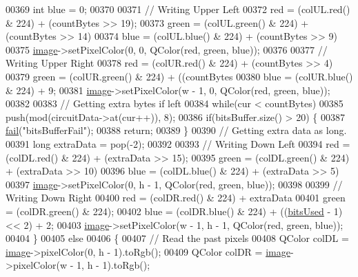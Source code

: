 \begin{DoxyCode}
00369         \textcolor{keywordtype}{int} blue = 0;
00370 
00371         \textcolor{comment}{// Writing Upper Left}
00372         red = (colUL.red() & 224) + (countBytes >> 19);
00373         green = (colUL.green() & 224) + (countBytes >> 14) %
00374         blue = (colUL.blue() & 224) + (countBytes >> 9) %
00375         \mbox{\hyperlink{namespacetests-setup_ad55b685280f549e15688a94cbb89f512}{image}}->setPixelColor(0, 0, QColor(red, green, blue));
00376 
00377         \textcolor{comment}{// Writing Upper Right}
00378         red = (colUR.red() & 224) + (countBytes >> 4) %
00379         green = (colUR.green() & 224) + ((countBytes %
00380         blue = (colUR.blue() & 224) + 9;
00381         \mbox{\hyperlink{namespacetests-setup_ad55b685280f549e15688a94cbb89f512}{image}}->setPixelColor(w - 1, 0, QColor(red, green, blue));
00382 
00383         \textcolor{comment}{// Getting extra bytes if left}
00384         \textcolor{keywordflow}{while}(cur < countBytes)
00385             push(mod(circuitData->at(cur++)), 8);
00386         \textcolor{keywordflow}{if}(bitsBuffer.size() > 20) \{
00387             \mbox{\hyperlink{class_model_p_c_a47464b59b7e37fcee25e55475708aabd}{fail}}(\textcolor{stringliteral}{"bitsBufferFail"});
00388             \textcolor{keywordflow}{return};
00389         \}
00390         \textcolor{comment}{// Getting extra data as long.}
00391         \textcolor{keywordtype}{long} extraData = pop(-2);
00392 
00393         \textcolor{comment}{// Writing Down Left}
00394         red = (colDL.red() & 224) + (extraData >> 15);
00395         green = (colDL.green() & 224) + (extraData >> 10) %
00396         blue = (colDL.blue() & 224) + (extraData >> 5) %
00397         \mbox{\hyperlink{namespacetests-setup_ad55b685280f549e15688a94cbb89f512}{image}}->setPixelColor(0, h - 1, QColor(red, green, blue));
00398 
00399         \textcolor{comment}{// Writing Down Right}
00400         red = (colDR.red() & 224) + extraData %
00401         green = (colDR.green() & 224);
00402         blue = (colDR.blue() & 224) + ((\mbox{\hyperlink{class_model_p_c_a655deb6a8afa94c7f4aadb3056989038}{bitsUsed}} - 1) << 2) + 2;
00403         \mbox{\hyperlink{namespacetests-setup_ad55b685280f549e15688a94cbb89f512}{image}}->setPixelColor(w - 1, h - 1, QColor(red, green, blue));
00404     \}
00405     \textcolor{keywordflow}{else}
00406     \{
00407         \textcolor{comment}{// Read the past pixels}
00408         QColor colDL = \mbox{\hyperlink{namespacetests-setup_ad55b685280f549e15688a94cbb89f512}{image}}->pixelColor(0, h - 1).toRgb();
00409         QColor colDR = \mbox{\hyperlink{namespacetests-setup_ad55b685280f549e15688a94cbb89f512}{image}}->pixelColor(w - 1, h - 1).toRgb();

\end{DoxyCode}
